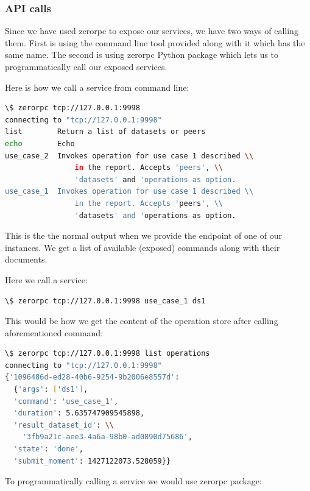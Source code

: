 \subsubsection{API calls}
Since we have used zerorpc to expose our services, we have two ways of calling them.
First is using the command line tool provided along with it which has the same name.
The second is using zerorpc Python package which lets us to programmatically call
our exposed services.

Here is how we call a service from command line:

\begin{lstlisting}[language=sh, caption={Quering an API endpoint for available commands}]
\$ zerorpc tcp://127.0.0.1:9998
connecting to "tcp://127.0.0.1:9998"
list        Return a list of datasets or peers
echo        Echo
use_case_2  Invokes operation for use case 1 described \\
				in the report. Accepts 'peers', \\
				'datasets' and 'operations as option.
use_case_1  Invokes operation for use case 1 described \\
				in the report. Accepts 'peers', \\
				'datasets' and 'operations as option.
\end{lstlisting}

This is the the normal output when we provide the endpoint of one of our instances. 
We get a list of available (exposed) commands along with their documents.

Here we call a service:
\begin{lstlisting}[language=sh, caption={Running an operation on a dataset}]
\$ zerorpc tcp://127.0.0.1:9998 use_case_1 ds1
\end{lstlisting}

This would be how we get the content of the operation store after calling aforementioned command:

\begin{lstlisting}[language=sh, caption={Getting list of operations}]
\$ zerorpc tcp://127.0.0.1:9998 list operations
connecting to "tcp://127.0.0.1:9998"
{'1096486d-ed28-40b6-9254-9b2006e8557d': 
  {'args': ['ds1'],
  'command': 'use_case_1',
  'duration': 5.635747909545898,
  'result_dataset_id': \\
  	'3fb9a21c-aee3-4a6a-98b0-ad0890d75686',
  'state': 'done',
  'submit_moment': 1427122073.528059}}
\end{lstlisting}

To programmatically calling a service we would use zerorpc package:

